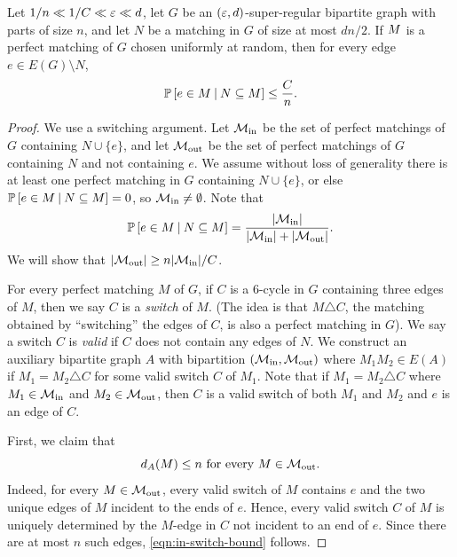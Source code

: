 \documentclass[11pt]{amsart}
\begin{document}
\begin{lemma}\label{lem:switchings}
    Let $1 / n \ll 1 / C \ll \varepsilon \ll d$, let $G$ be an $(\varepsilon, d)$-super-regular bipartite graph with parts of size $n$, and let $N$ be a matching in $G$ of size at most $dn / 2$.  
    If $M$ is a perfect matching of $G$ chosen uniformly at random, then for every edge $e \in E(G) \setminus N$,  
    \begin{equation*}
         \mathbb P\left[e \in M\:\middle|\:N \subseteq M\right]  \leq \frac{C}{n}.
    \end{equation*}
\end{lemma}
\begin{proof}
    We use a switching argument.      
    Let $\mathcal M_{\mathrm{in}}$ be the set of perfect matchings of $G$ containing $N \cup \{e\}$, and let $\mathcal M_{\mathrm{out}}$ be the set of perfect matchings of $G$ containing $N$ and not containing $e$.
    We assume without loss of generality there is at least one perfect matching in $G$ containing $N \cup \{e\}$, or else $ \mathbb P\left[e \in M\:\middle|\:N \subseteq M\right]  = 0$, so $\mathcal M_{\mathrm{in}} \neq \emptyset$.
    Note that 
    \begin{equation}\label{eqn:switching-prob}
         \mathbb P\left[e \in M\:\middle|\:N \subseteq M\right]  = \frac{|\mathcal M_{\mathrm{in}}|}{|\mathcal M_{\mathrm{in}}| + |\mathcal M_{\mathrm{out}}|}.
    \end{equation}
    We will show that $|\mathcal M_{\mathrm{out}}| \geq n|\mathcal M_{\mathrm{in}}| / C$.
    
    For every perfect matching $M$ of $G$, if $C$ is a $6$-cycle in $G$ containing three edges of $M$, then we say $C$ is a \textit{switch} of $M$.  
    (The idea is that $M \triangle C$, the matching obtained by ``switching'' the edges of $C$, is also a perfect matching in $G$).  
    We say a switch $C$ is \textit{valid} if $C$ does not contain any edges of $N$.
    We construct an auxiliary bipartite graph $A$ with bipartition $(\mathcal M_{\mathrm{in}}, \mathcal M_{\mathrm{out}})$ where $M_1M_2 \in E(A)$ if $M_1 = M_2 \triangle C$ for some valid switch $C$ of $M_1$.  Note that if $M_1 = M_2 \triangle C$ where $M_1 \in \mathcal M_{\mathrm{in}}$ and $M_2 \in \mathcal M_{\mathrm{out}}$, then $C$ is a valid switch of both $M_1$ and $M_2$ and $e$ is an edge of $C$.

    First, we claim that
    \begin{equation}\label{eqn:in-switch-bound}
        d_A(M) \leq n \text{ for every } M \in \mathcal M_{\mathrm{out}}.
    \end{equation}
    Indeed, for every $M \in \mathcal M_{\mathrm{out}}$, every valid switch of $M$ contains $e$ and the two unique edges of $M$ incident to the ends of $e$.  Hence, every valid switch $C$ of $M$ is uniquely determined by the $M$-edge in $C$ not incident to an end of $e$.  Since there are at most $n$ such edges, \cref{eqn:in-switch-bound} follows.


\end{proof}
\end{document}
